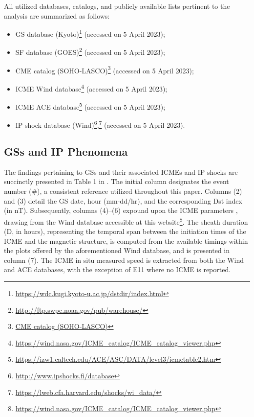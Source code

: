 All utilized databases, catalogs, and publicly available lists pertinent to the analysis are summarized as follows:

\begin{itemize}
	\item GS database (Kyoto)\footnote{\url{https://wdc.kugi.kyoto-u.ac.jp/dstdir/index.html}} (accessed on 5 April 2023);
	\item SF database (GOES)\footnote{\url{http://ftp.swpc.noaa.gov/pub/warehouse/}} (accessed on 5 April 2023);
	\item CME catalog (SOHO-LASCO)\footnote{\url{CME catalog (SOHO-LASCO)}} (accessed on 5 April 2023);
	\item ICME Wind database\footnote{\url{https://wind.nasa.gov/ICME_catalog/ICME_catalog_viewer.php}} (accessed on 5 April 2023);
	\item ICME ACE database\footnote{\url{https://izw1.caltech.edu/ACE/ASC/DATA/level3/icmetable2.htm}} (accessed on 5 April 2023);
	\item IP shock database (Wind)\footnote{\url{http://www.ipshocks.fi/database}},\footnote{\url{https://lweb.cfa.harvard.edu/shocks/wi_data/}} (accessed on 5 April 2023).
\end{itemize}

\subsection{GSs and IP Phenomena}
The findings pertaining to GSs and their associated ICMEs and IP shocks are succinctly presented in Table 1 in \citet{miteva_2023}. The initial column designates the event number (\#), a consistent reference utilized throughout this paper. Columns (2) and (3) detail the GS date, hour (mm-dd/hr), and the corresponding Dst index (in nT). Subsequently, columns (4)–(6) expound upon the ICME parameters \citep{nieves_2018}, drawing from the Wind database accessible at this website\footnote{\url{https://wind.nasa.gov/ICME_catalog/ICME_catalog_viewer.php}}. The sheath duration (D, in hours), representing the temporal span between the initiation times of the ICME and the magnetic structure, is computed from the available timings within the plots offered by the aforementioned Wind database, and is presented in column (7). The ICME in situ measured speed is extracted from both the Wind and ACE databases, with the exception of E11 where no ICME is reported.

